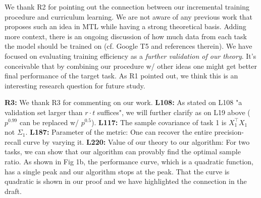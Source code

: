 \documentclass{article}
\begin{document}
\vspace{-0.045in}
We thank R2 for pointing out the connection between our incremental training procedure and curriculum learning.
We are not aware of any previous work that proposes such an idea in MTL while having a strong theoretical basis.
Adding more context, there is an ongoing discussion of how much data from each task the model should be trained on (cf. Google T5 and references therein).
We have focused on evaluating training efficiency as a \textit{further validation of our theory}.
It's conceivable that by combining our procedure w/ other ideas one might get better final performance of the target task.
As R1 pointed out, we think this is an interesting research question for future study.

\vspace{-0.025in}
\textbf{R3:}
We thank R3 for commenting on our work.
\textbf{L108:}
As stated on L108  "a validation set larger than $r\cdot t$ suffices", we will further clarify as on L19 above ($p^{0.99}$ can be replaced w/ $p^{0.5}$).
\textbf{L117:} The sample covariance of task 1 is  $X_1^{\top}X_1$ not $\Sigma_1$.
\textbf{L187:} Parameter of the metric: One can recover the entire precision-recall curve by varying it.
\textbf{L220:} Value of our theory to our algorithm:
For two tasks, we can show that our algorithm can provably find the optimal sample ratio. As shown in Fig 1b, the performance curve, which is a quadratic function, has a single peak and our algorithm stops at the peak.
That the curve is quadratic is shown in our proof and we have highlighted the connection in the draft.
\end{document}
